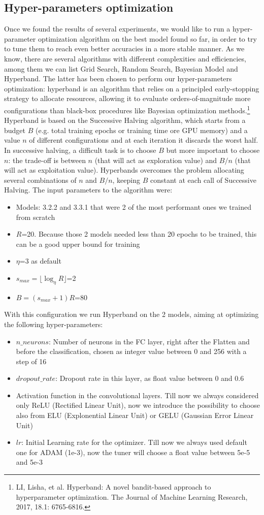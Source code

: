\subsection{Hyper-parameters optimization}
Once we found the results of several experiments, we would like to run a hyper-parameter optimization algorithm on the best model found so far, in order to try to tune them to reach even better accuracies in a more stable manner. As we know, there are several algorithms with different complexities and efficiencies, among them we can list Grid Search, Random Search, Bayesian Model and Hyperband. The latter has been chosen to perform our hyper-parameters optimization: hyperband is an algorithm that relies on a principled early-stopping strategy to allocate resources, allowing it to evaluate orders-of-magnitude more configurations than black-box procedures like Bayesian optimization methods.\footnote{LI, Lisha, et al. Hyperband: A novel bandit-based approach to hyperparameter optimization. The Journal of Machine Learning Research, 2017, 18.1: 6765-6816.}
Hyperband is based on the Successive Halving algorithm, which starts from a budget $B$ (e.g. total training epochs or training time ore GPU memory) and a value $n$ of different configurations and at each iteration it discards the worst half. In successive halving, a difficult task is to choose $B$ but more important to choose $n$: the trade-off is between $n$ (that will act as exploration value) and $B/n$ (that will act as exploitation value).
Hyperbands overcomes the problem allocating several combinations of $n$ and $B/n$, keeping $B$ constant at each call of Successive Halving.
The input parameters to the algorithm were:
\begin{itemize}
\item Models: 3.2.2 and 3.3.1 that were 2 of the most performant ones we trained from scratch
\item $R$=20. Because those 2 models needed less than 20 epochs to be trained, this can be a good upper bound for training
\item $\eta$=3 as default
\item $s_{max}=\lfloor \log_{\eta} R \rfloor$=2
\item $B=(s_{max}+1)R$=80
\end{itemize}
With this configuration we run Hyperband on the 2 models, aiming at optimizing the following hyper-parameters:
\begin{itemize}
\item $n\_neurons$: Number of neurons in the FC layer, right after the Flatten and before the classification, chosen as integer value between 0 and 256 with a step of 16
\item $dropout\_rate$: Dropout rate in this layer, as float value between 0 and 0.6
\item Activation function in the convolutional layers. Till now we always considered only ReLU (Rectified Linear Unit), now we introduce the possibility to choose also from ELU (Explonential Linear Unit) or GELU (Gaussian Error Linear Unit)
\item $lr$: Initial Learning rate for the optimizer. Till now we always used default one for ADAM (1e-3), now the tuner will choose a float value between 5e-5 and 5e-3
\end{itemize}
